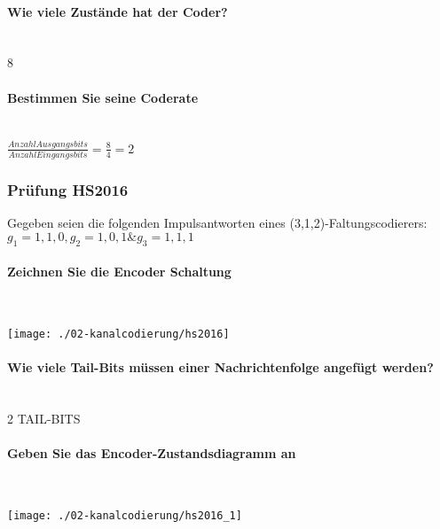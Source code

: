 \paragraph{Wie viele Zustände hat der Coder?}\mbox{}\\
8

\paragraph{Bestimmen Sie seine Coderate}\mbox{}\\
$\frac{Anzahl Ausgangsbits}{Anzahl Eingangsbits} = \frac{8}{4}=2$\\

\subsubsection{Prüfung HS2016}
Gegeben seien die folgenden Impulsantworten eines (3,1,2)-Faltungscodierers:\\
${g_1}={1,1,0}, {g_2}={1,0,1} \& {g_3}={1,1,1}$\\

\paragraph{Zeichnen Sie die Encoder Schaltung}\mbox{}\\
\begin{center}
    \vspace{-8pt}
    \texttt{[image: ./02-kanalcodierung/hs2016]}
    \vspace{-8pt}
\end{center}

\paragraph{Wie viele Tail-Bits müssen einer Nachrichtenfolge angefügt werden?}\mbox{}\\
2 TAIL-BITS

\paragraph{Geben Sie das Encoder-Zustandsdiagramm an}\mbox{}\\
\begin{center}
    \vspace{-8pt}
    \texttt{[image: ./02-kanalcodierung/hs2016\_1]}
    \vspace{-8pt}
\end{center}

